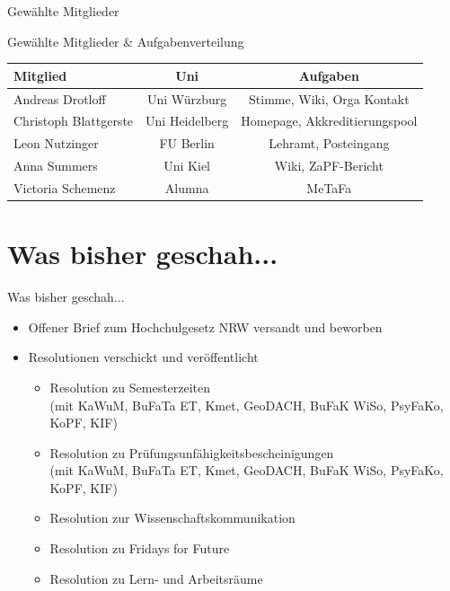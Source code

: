 \documentclass[compress, aspectratio=169]{beamer}
\begin{document}
\begin{frame}{Gewählte Mitglieder}
\begin{minipage}{.3\textwidth}
  \end{minipage}
  \hspace{0.1\textwidth}

\end{frame}

\begin{frame}{Gewählte Mitglieder \& Aufgabenverteilung}
  \begin{tabular}{lcc}
    Mitglied & Uni & Aufgaben \\ \hline
    Andreas Drotloff & Uni Würzburg & Stimme, Wiki, Orga Kontakt \\
    Christoph Blattgerste & Uni Heidelberg & Homepage, Akkreditierungspool \\
    Leon Nutzinger & FU Berlin & Lehramt, Posteingang \\
    Anna Summers & Uni Kiel & Wiki, ZaPF-Bericht \\
    Victoria Schemenz & Alumna & MeTaFa
  \end{tabular}
\end{frame}

\section{Was bisher geschah...}

\begin{frame}{Was bisher geschah...}
  \begin{itemize}
    \item Offener Brief zum Hochchulgesetz NRW versandt und beworben
    \item Resolutionen verschickt und veröffentlicht
    \begin{itemize}
        \item Resolution zu Semesterzeiten \\
          (mit KaWuM, BuFaTa ET, Kmet, GeoDACH, BuFaK WiSo, PsyFaKo, KoPF, KIF)
        \item Resolution zu Prüfungsunfähigkeitsbescheinigungen \\
          (mit KaWuM, BuFaTa ET, Kmet, GeoDACH, BuFaK WiSo, PsyFaKo, KoPF, KIF)
        \item Resolution zur Wissenschaftskommunikation
        \item Resolution zu Fridays for Future
        \item Resolution zu Lern- und Arbeitsräume
    \end{itemize}
  \end{itemize}
\end{frame}
\end{document}
